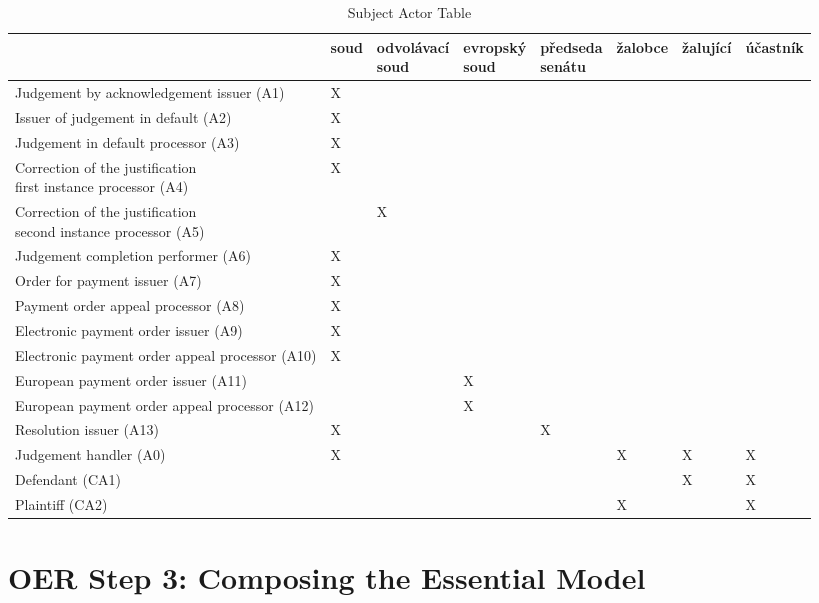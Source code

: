 \begin{landscape}
\begin{table}[h]
\caption{Subject Actor Table}
\label{tab:subjectactortable}
\begin{tabular}{|l|l|l|l|l|l|l|l|}
\hline
	 & soud  &  \thead{odvolávací\\ soud} & \thead{evropský\\ soud} & \thead{předseda\\ senátu} & žalobce & žalující & účastník  \\ \hline
Judgement by acknowledgement issuer (A1) & X &  &  & & & & \\ \hline
Issuer of judgement in default (A2) & X &  & & & & & \\ \hline
Judgement in default processor (A3) & X & & & & & &\\ \hline
\makecell{Correction of the justification\\ first instance processor (A4)} & X  &  & & & & &\\ \hline
\makecell{Correction of the justification\\ second instance processor (A5)} &  & X & &  & & &\\ \hline
Judgement completion performer (A6) & X  & & & & & & \\ \hline
Order for payment issuer (A7) & X  & & & & &  &\\ \hline
Payment order appeal processor (A8) & X & & & & &  &\\ \hline
Electronic payment order issuer (A9) & X & & & & &  &\\ \hline
Electronic payment order appeal processor (A10) & X & & & & &  &\\ \hline
European payment order issuer  (A11) &  & &  X & & &  &\\ \hline
European payment order appeal processor (A12) &  & & X & & & & \\ \hline
Resolution issuer (A13) & X &  & & X & & &\\ \hline
Judgement handler (A0) & X &  & &  & X & X & X\\ \hline
Defendant (CA1) &  &  & & & & X & X\\ \hline
Plaintiff (CA2) &  &  & & & X &  & X\\ \hline
\end{tabular}
\end{table}


\end{landscape}

\section{OER Step 3: Composing the Essential Model}

